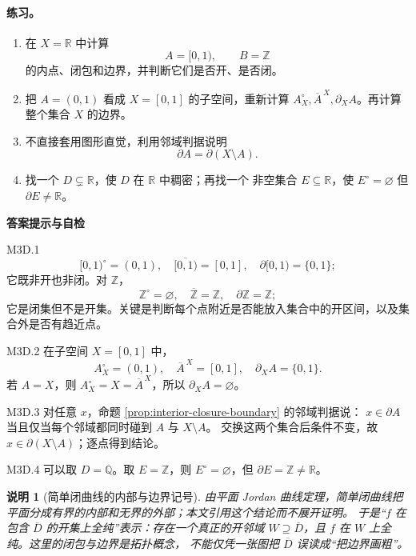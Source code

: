 \documentclass[UTF8,fontset=none,a4paper,11pt]{ctexart}
\theoremstyle{foundation-definition}
\theoremstyle{foundation-theorem}
\theoremstyle{foundation-proposition}
\theoremstyle{foundation-example}
\theoremstyle{foundation-remark}
\newtheorem{remark}[definition]{说明}
\theoremstyle{foundation-theorem}
\newenvironment{answerkey}{%
\begin{mdframed}[backgroundcolor=examplebg,linecolor=examplepurple,linewidth=1.0pt,
  leftline=true,rightline=false,topline=false,bottomline=false,
  skipabove=7pt,skipbelow=8pt,innerleftmargin=10pt,innerrightmargin=8pt,
  innertopmargin=6pt,innerbottommargin=6pt]
{\sffamily\bfseries\color{examplepurple}答案提示与自检}\par\smallskip\small
}{\end{mdframed}}
\begin{document}
\paragraph{练习。}
\begin{enumerate}[label=M3D.\arabic*.]
  \item 在 \(X=\mathbb R\) 中计算
  \[
  A=[0,1),\qquad B=\mathbb Z
  \]
  的内点、闭包和边界，并判断它们是否开、是否闭。
  \item 把 \(A=(0,1)\) 看成 \(X=[0,1]\) 的子空间，重新计算
  \(A^\circ_X,\overline A^{\,X},\partial_XA\)。再计算整个集合 \(X\) 的边界。
  \item 不直接套用图形直觉，利用邻域判据说明
  \[
  \partial A=\partial(X\setminus A).
  \]
  \item 找一个 \(D\subsetneq\mathbb R\)，使 \(D\) 在 \(\mathbb R\) 中稠密；再找一个
  非空集合 \(E\subseteq\mathbb R\)，使 \(E^\circ=\varnothing\) 但
  \(\partial E\ne\mathbb R\)。
\end{enumerate}

\begin{answerkey}
M3D.1
\[
[0,1)^\circ=(0,1),\quad \overline{[0,1)}=[0,1],\quad
\partial[0,1)=\{0,1\};
\]
它既非开也非闭。对 \(\mathbb Z\)，
\[
\mathbb Z^\circ=\varnothing,\quad \overline{\mathbb Z}=\mathbb Z,\quad
\partial\mathbb Z=\mathbb Z;
\]
它是闭集但不是开集。关键是判断每个点附近是否能放入集合中的开区间，以及集合外是否有趋近点。

M3D.2 在子空间 \(X=[0,1]\) 中，
\[
A^\circ_X=(0,1),\quad \overline A^{\,X}=[0,1],\quad \partial_XA=\{0,1\}.
\]
若 \(A=X\)，则 \(A^\circ_X=X=\overline A^{\,X}\)，所以
\(\partial_XA=\varnothing\)。

M3D.3 对任意 \(x\)，命题 \ref{prop:interior-closure-boundary} 的邻域判据说：
\(x\in\partial A\) 当且仅当每个邻域都同时碰到 \(A\) 与 \(X\setminus A\)。
交换这两个集合后条件不变，故 \(x\in\partial(X\setminus A)\)；逐点得到结论。

M3D.4 可以取 \(D=\mathbb Q\)。取 \(E=\mathbb Z\)，则
\(E^\circ=\varnothing\)，但 \(\partial E=\mathbb Z\ne\mathbb R\)。
\end{answerkey}

\begin{remark}[简单闭曲线的内部与边界记号]\label{rem:curve-boundary-notation}
由平面 Jordan 曲线定理，简单闭曲线把平面分成有界的内部和无界的外部；本文引用这个结论而不展开证明。
于是“\(f\) 在包含 \(\overline D\) 的开集上全纯”表示：存在一个真正的开邻域
\(W\supseteq\overline D\)，且 \(f\) 在 \(W\) 上全纯。这里的闭包与边界是拓扑概念，
不能仅凭一张图把 \(\overline D\) 误读成“把边界画粗”。
\end{remark}
\end{document}
